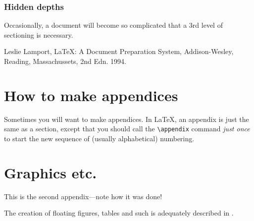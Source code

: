 \documentclass{cernatsreport}    %
\begin{document}
\subsubsection{Hidden depths}
Occasionally, a document will become so complicated that
a 3rd level of sectioning is necessary.

\begin{thebibliography}{9}

 Leslie Lamport,
      \LaTeX: A Document Preparation System,
      Addison-Wesley, Reading, Massachussets, 2nd Edn. 1994.
 

\end{thebibliography}


\appendix
\section{How to make appendices}

Sometimes you will want to make appendices.  In    \LaTeX, an
appendix is just the same as a section, except that you should
call the \verb|\appendix| command     {\it just once\/}
to start the new sequence of (usually alphabetical) numbering.

\section{Graphics etc.}

This is the second appendix---note how it was done!

The creation of floating figures, tables and such is adequately
described in \cite{Lamport}.   
\end{document}
